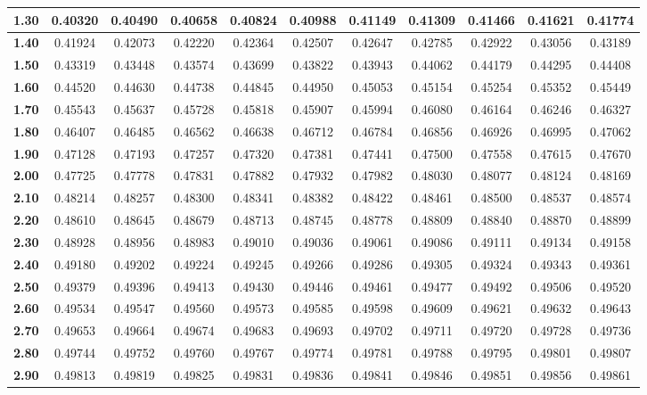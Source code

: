 \begin{tabular}{|c|c|c|c|c|c|c|c|c|c|c|}
\hline
\textbf{ 1.30 } & 0.40320 & 0.40490 & 0.40658 & 0.40824 & 0.40988 & 0.41149 & 0.41309 & 0.41466 & 0.41621 & 0.41774\\ 
\hline
\textbf{ 1.40 } & 0.41924 & 0.42073 & 0.42220 & 0.42364 & 0.42507 & 0.42647 & 0.42785 & 0.42922 & 0.43056 & 0.43189\\ 
\hline
\textbf{ 1.50 } & 0.43319 & 0.43448 & 0.43574 & 0.43699 & 0.43822 & 0.43943 & 0.44062 & 0.44179 & 0.44295 & 0.44408\\ 
\hline
\textbf{ 1.60 } & 0.44520 & 0.44630 & 0.44738 & 0.44845 & 0.44950 & 0.45053 & 0.45154 & 0.45254 & 0.45352 & 0.45449\\ 
\hline
\textbf{ 1.70 } & 0.45543 & 0.45637 & 0.45728 & 0.45818 & 0.45907 & 0.45994 & 0.46080 & 0.46164 & 0.46246 & 0.46327\\ 
\hline
\textbf{ 1.80 } & 0.46407 & 0.46485 & 0.46562 & 0.46638 & 0.46712 & 0.46784 & 0.46856 & 0.46926 & 0.46995 & 0.47062\\ 
\hline
\textbf{ 1.90 } & 0.47128 & 0.47193 & 0.47257 & 0.47320 & 0.47381 & 0.47441 & 0.47500 & 0.47558 & 0.47615 & 0.47670\\ 
\hline
\textbf{ 2.00 } & 0.47725 & 0.47778 & 0.47831 & 0.47882 & 0.47932 & 0.47982 & 0.48030 & 0.48077 & 0.48124 & 0.48169\\ 
\hline
\textbf{ 2.10 } & 0.48214 & 0.48257 & 0.48300 & 0.48341 & 0.48382 & 0.48422 & 0.48461 & 0.48500 & 0.48537 & 0.48574\\ 
\hline
\textbf{ 2.20 } & 0.48610 & 0.48645 & 0.48679 & 0.48713 & 0.48745 & 0.48778 & 0.48809 & 0.48840 & 0.48870 & 0.48899\\ 
\hline
\textbf{ 2.30 } & 0.48928 & 0.48956 & 0.48983 & 0.49010 & 0.49036 & 0.49061 & 0.49086 & 0.49111 & 0.49134 & 0.49158\\ 
\hline
\textbf{ 2.40 } & 0.49180 & 0.49202 & 0.49224 & 0.49245 & 0.49266 & 0.49286 & 0.49305 & 0.49324 & 0.49343 & 0.49361\\ 
\hline
\textbf{ 2.50 } & 0.49379 & 0.49396 & 0.49413 & 0.49430 & 0.49446 & 0.49461 & 0.49477 & 0.49492 & 0.49506 & 0.49520\\ 
\hline
\textbf{ 2.60 } & 0.49534 & 0.49547 & 0.49560 & 0.49573 & 0.49585 & 0.49598 & 0.49609 & 0.49621 & 0.49632 & 0.49643\\ 
\hline
\textbf{ 2.70 } & 0.49653 & 0.49664 & 0.49674 & 0.49683 & 0.49693 & 0.49702 & 0.49711 & 0.49720 & 0.49728 & 0.49736\\ 
\hline
\textbf{ 2.80 } & 0.49744 & 0.49752 & 0.49760 & 0.49767 & 0.49774 & 0.49781 & 0.49788 & 0.49795 & 0.49801 & 0.49807\\ 
\hline
\textbf{ 2.90 } & 0.49813 & 0.49819 & 0.49825 & 0.49831 & 0.49836 & 0.49841 & 0.49846 & 0.49851 & 0.49856 & 0.49861\\ 
\hline
\end{tabular}
